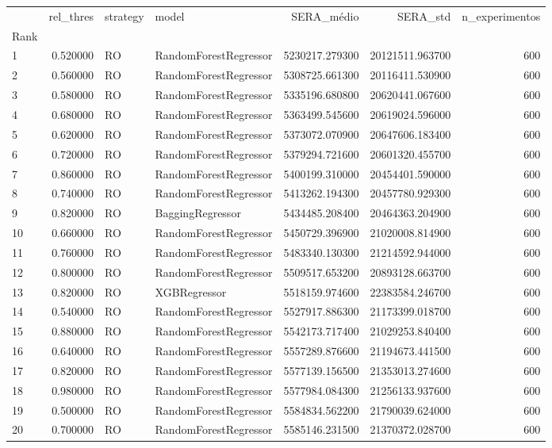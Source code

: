 \begin{tabular}{lrllrrr}
\toprule
 & rel_thres & strategy & model & SERA_médio & SERA_std & n_experimentos \\
Rank &  &  &  &  &  &  \\
\midrule
1 & 0.520000 & RO & RandomForestRegressor & 5230217.279300 & 20121511.963700 & 600 \\
2 & 0.560000 & RO & RandomForestRegressor & 5308725.661300 & 20116411.530900 & 600 \\
3 & 0.580000 & RO & RandomForestRegressor & 5335196.680800 & 20620441.067600 & 600 \\
4 & 0.680000 & RO & RandomForestRegressor & 5363499.545600 & 20619024.596000 & 600 \\
5 & 0.620000 & RO & RandomForestRegressor & 5373072.070900 & 20647606.183400 & 600 \\
6 & 0.720000 & RO & RandomForestRegressor & 5379294.721600 & 20601320.455700 & 600 \\
7 & 0.860000 & RO & RandomForestRegressor & 5400199.310000 & 20454401.590000 & 600 \\
8 & 0.740000 & RO & RandomForestRegressor & 5413262.194300 & 20457780.929300 & 600 \\
9 & 0.820000 & RO & BaggingRegressor & 5434485.208400 & 20464363.204900 & 600 \\
10 & 0.660000 & RO & RandomForestRegressor & 5450729.396900 & 21020008.814900 & 600 \\
11 & 0.760000 & RO & RandomForestRegressor & 5483340.130300 & 21214592.944000 & 600 \\
12 & 0.800000 & RO & RandomForestRegressor & 5509517.653200 & 20893128.663700 & 600 \\
13 & 0.820000 & RO & XGBRegressor & 5518159.974600 & 22383584.246700 & 600 \\
14 & 0.540000 & RO & RandomForestRegressor & 5527917.886300 & 21173399.018700 & 600 \\
15 & 0.880000 & RO & RandomForestRegressor & 5542173.717400 & 21029253.840400 & 600 \\
16 & 0.640000 & RO & RandomForestRegressor & 5557289.876600 & 21194673.441500 & 600 \\
17 & 0.820000 & RO & RandomForestRegressor & 5577139.156500 & 21353013.274600 & 600 \\
18 & 0.980000 & RO & RandomForestRegressor & 5577984.084300 & 21256133.937600 & 600 \\
19 & 0.500000 & RO & RandomForestRegressor & 5584834.562200 & 21790039.624000 & 600 \\
20 & 0.700000 & RO & RandomForestRegressor & 5585146.231500 & 21370372.028700 & 600 \\
\bottomrule
\end{tabular}
